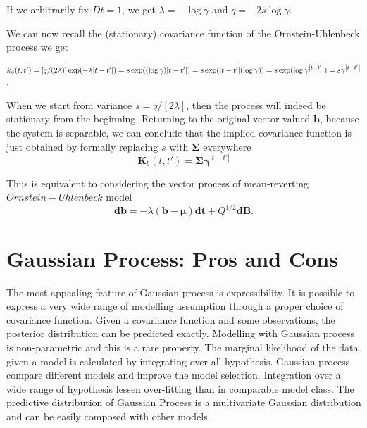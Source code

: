 If we arbitrarily fix $Dt = 1$, we get
$\lambda = -\log \gamma$ and $q = -2 s \log \gamma$.

We can now recall the (stationary) covariance function of the Ornstein-Uhlenbeck process we get

$k_u(t,t')
  = [q / (2 \lambda)] \exp(-\lambda {\left|t-t'\right|})\\
  = s \exp((\log \gamma) {\left|t-t'\right|})\\
  = s \exp({\left|t-t'\right|}(\log \gamma))\\
  = s \exp(\log \gamma^{\left|t-t'\right|})\\
  = s \gamma^{\left|t-t'\right|}$.

When we start from variance $s = q / \left[2 \lambda\right]$, then the process will indeed be stationary from the beginning. Returning to the original vector valued $\textbf{b}$, because the system is separable, we can conclude that the implied covariance function is just obtained by formally replacing $s$ with $\boldsymbol{\Sigma}$ everywhere
\begin{equation}
\textbf{K}_b(t,t') = \boldsymbol{\Sigma} \boldsymbol{\gamma}^{\left|t-t'\right|}
\end{equation}

Thus is equivalent to considering the vector process of mean-reverting $Ornstein-Uhlenbeck$ model
\begin{equation}
\textbf{db} = -\lambda (\textbf{b} - \boldsymbol{\mu}) \textbf{dt} + Q^{1/2} \textbf{dB}.
\end{equation}

\section{Gaussian Process: Pros and Cons}
The most appealing feature of Gaussian process is expressibility. It is possible to express a very wide range of modelling assumption through a proper choice of covariance function. Given a covariance function and some observations, the posterior distribution can be predicted exactly. Modelling with Gaussian process is non-parametric and this is a rare property. The marginal likelihood of the data given a model is calculated by integrating over all hypothesis. Gaussian process compare different models and improve the model selection. Integration over a wide range of hypothesis lessen over-fitting than in comparable model class. The predictive distribution of Gaussian Process is a multivariate Gaussian distribution and can be easily composed with other models.

